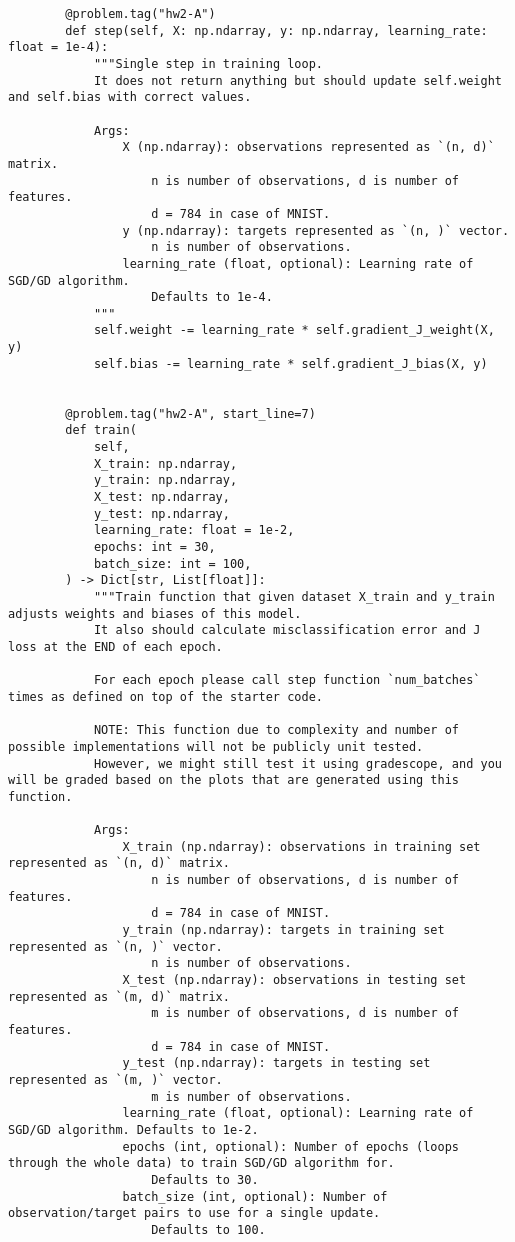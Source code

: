 \documentclass{article}
\begin{document}
\begin{lstlisting}
        @problem.tag("hw2-A")
        def step(self, X: np.ndarray, y: np.ndarray, learning_rate: float = 1e-4):
            """Single step in training loop.
            It does not return anything but should update self.weight and self.bias with correct values.
    
            Args:
                X (np.ndarray): observations represented as `(n, d)` matrix.
                    n is number of observations, d is number of features.
                    d = 784 in case of MNIST.
                y (np.ndarray): targets represented as `(n, )` vector.
                    n is number of observations.
                learning_rate (float, optional): Learning rate of SGD/GD algorithm.
                    Defaults to 1e-4.
            """
            self.weight -= learning_rate * self.gradient_J_weight(X, y)
            self.bias -= learning_rate * self.gradient_J_bias(X, y)
    
    
        @problem.tag("hw2-A", start_line=7)
        def train(
            self,
            X_train: np.ndarray,
            y_train: np.ndarray,
            X_test: np.ndarray,
            y_test: np.ndarray,
            learning_rate: float = 1e-2,
            epochs: int = 30,
            batch_size: int = 100,
        ) -> Dict[str, List[float]]:
            """Train function that given dataset X_train and y_train adjusts weights and biases of this model.
            It also should calculate misclassification error and J loss at the END of each epoch.
    
            For each epoch please call step function `num_batches` times as defined on top of the starter code.
    
            NOTE: This function due to complexity and number of possible implementations will not be publicly unit tested.
            However, we might still test it using gradescope, and you will be graded based on the plots that are generated using this function.
    
            Args:
                X_train (np.ndarray): observations in training set represented as `(n, d)` matrix.
                    n is number of observations, d is number of features.
                    d = 784 in case of MNIST.
                y_train (np.ndarray): targets in training set represented as `(n, )` vector.
                    n is number of observations.
                X_test (np.ndarray): observations in testing set represented as `(m, d)` matrix.
                    m is number of observations, d is number of features.
                    d = 784 in case of MNIST.
                y_test (np.ndarray): targets in testing set represented as `(m, )` vector.
                    m is number of observations.
                learning_rate (float, optional): Learning rate of SGD/GD algorithm. Defaults to 1e-2.
                epochs (int, optional): Number of epochs (loops through the whole data) to train SGD/GD algorithm for.
                    Defaults to 30.
                batch_size (int, optional): Number of observation/target pairs to use for a single update.
                    Defaults to 100.
    

\end{lstlisting}
\end{document}
